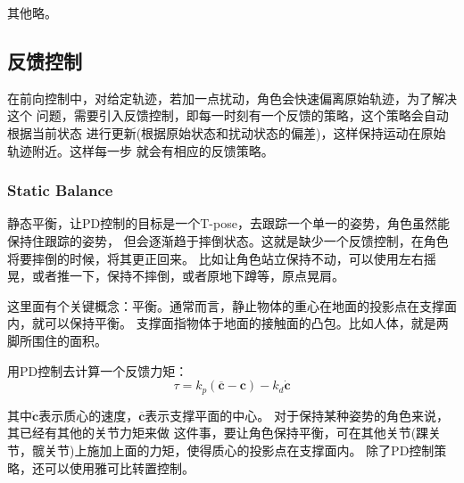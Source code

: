 \documentclass[lang=cn,newtx,10pt,scheme=chinese]{elegantbook}
\begin{document}
其他略。
\subsection{反馈控制}
在前向控制中，对给定轨迹，若加一点扰动，角色会快速偏离原始轨迹，为了解决这个
问题，需要引入反馈控制，即每一时刻有一个反馈的策略，这个策略会自动根据当前状态
进行更新(根据原始状态和扰动状态的偏差)，这样保持运动在原始轨迹附近。这样每一步
就会有相应的反馈策略。
\subsubsection{Static Balance}
静态平衡，让PD控制的目标是一个T-pose，去跟踪一个单一的姿势，角色虽然能保持住跟踪的姿势，
但会逐渐趋于摔倒状态。这就是缺少一个反馈控制，在角色将要摔倒的时候，将其更正回来。
比如让角色站立保持不动，可以使用左右摇晃，或者推一下，保持不摔倒，或者原地下蹲等，原点晃肩。

这里面有个关键概念：平衡。通常而言，静止物体的重心在地面的投影点在支撑面内，就可以保持平衡。
支撑面指物体于地面的接触面的凸包。比如人体，就是两脚所围住的面积。

用PD控制去计算一个反馈力矩：
\begin{equation}
  \label{eq:feedbackf}
\tau=k_p(\overline{\boldsymbol{c}}-\boldsymbol{c})-k_d \dot{\boldsymbol{c}}
\end{equation}

其中$\dot{\boldsymbol{c}}$表示质心的速度，$\overline{\boldsymbol{c}}$表示支撑平面的中心。
对于保持某种姿势的角色来说，其已经有其他的关节力矩来做
这件事，要让角色保持平衡，可在其他关节(踝关节，髋关节)上施加上面的力矩，使得质心的投影点在支撑面内。
除了PD控制策略，还可以使用雅可比转置控制。
\end{document}
